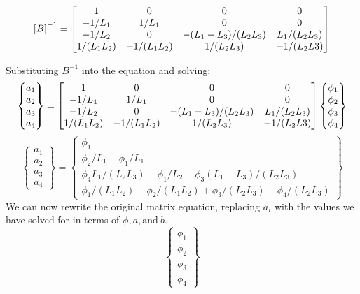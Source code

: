 \documentclass[12pt,letterpaper]{article}
\begin{document}
\begin{enumerate}[label=\arabic*.]
\begin{equation*}
			\end{equation*}
			\begin{equation*}
				\left[B\right]^{-1} = \mqty[1 & 0 & 0 & 0 \\ -1/L_1 & 1/L_1 & 0 & 0 \\ -1/L_2 & 0 & -(L_1-L_3)/(L_2L_3) & L_1/(L_2L_3)\\ 1/(L_1L_2) & -1/(L_1L_2) & 1/(L_2L_3) & -1/(L_2L3)]
			\end{equation*}
		
			Substituting $B^{-1}$ into the equation and solving:
			\begin{equation*}
				\begin{Bmatrix}
					a_1 \\ a_2 \\ a_3 \\a_4
				\end{Bmatrix}
				=\mqty[1 & 0 & 0 & 0 \\ -1/L_1 & 1/L_1 & 0 & 0 \\ -1/L_2 & 0 & -(L_1-L_3)/(L_2L_3) & L_1/(L_2L_3)\\ 1/(L_1L_2) & -1/(L_1L_2) & 1/(L_2L_3) & -1/(L_2L3)] 
				\begin{Bmatrix}
					\phi_1 \\ \phi_2 \\ \phi_3 \\ \phi_4
				\end{Bmatrix}
			\end{equation*}
			\begin{equation*}
				\begin{Bmatrix}
					a_1 \\ a_2 \\ a_3 \\ a_4
				\end{Bmatrix}
				= 
				\begin{Bmatrix}
					\phi_1 \\ \phi_2/L_1 - \phi_1/L_1 \\ \phi_4L_1/(L_2L_3) - \phi_1/L_2 - \phi_3(L_1-L_3)/(L_2L_3) \\ \phi_1/(L_1L_2) - \phi_2/(L_1L_2) + \phi_3 /(L_2L_3) - \phi_4/(L_2L_3)
				\end{Bmatrix}
			\end{equation*}
			We can now rewrite the original matrix equation, replacing $a_i$ with the values we have solved for in terms of $\phi, a, \textrm{and} \ b$.
			\begin{equation*}
				\begin{Bmatrix}
					\phi_1 \\ \phi_2 \\ \phi_3 \\ \phi_4

\end{Bmatrix}
\end{equation*}
\end{enumerate}
\end{document}
